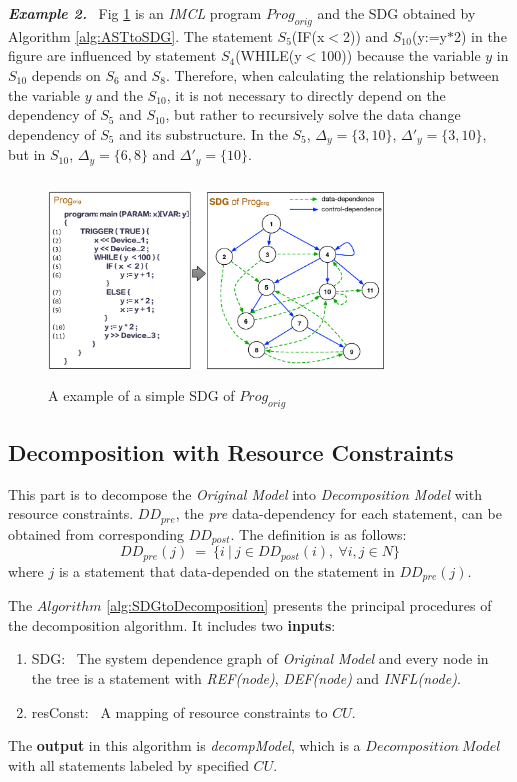 \textbf{\emph{Example 2.}} \ Fig \ref{fig_SDG_exapmle} is an \emph{IMCL} program $Prog_{orig}$ and the SDG obtained by Algorithm \ref{alg:ASTtoSDG}. The statement $S_{5}$(IF(x$<$2)) and $S_{10}$(y:=y$\ast$2) in the figure are influenced by statement $S_{4}$(WHILE(y$<$100)) because the variable $y$ in $S_{10}$ depends on $S_{6}$ and $S_{8}$. Therefore, when calculating the relationship between the variable $y$ and the $S_{10}$, it is not necessary to directly depend on the dependency of $S_{5}$ and $S_{10}$, but rather to recursively solve the data change dependency of $S_{5}$ and its substructure. In the $S_{5}$, $\Delta_{y}=\{3, 10\}$, $\Delta'_{y}=\{3, 10\}$, but in $S_{10}$, $\Delta_{y}=\{6,8\}$ and $\Delta'_{y} = \{10\}$.

\begin{figure}[!hptb]
    \centering
        \includegraphics[height=2.1in, width=3.5in]{fig_SDG_exapmle}
    \caption{A example of a simple SDG of $Prog_{orig}$}\label{fig_SDG_exapmle}
\end{figure}


\subsection{Decomposition with Resource Constraints}
This part is to decompose the \emph{Original Model} into \emph{Decomposition Model} with resource constraints. $DD_{pre}$, the \emph{pre} data-dependency for each statement, can be obtained from corresponding $DD_{post}$. The definition is as follows:
\begin{displaymath}
    DD_{pre}(j) \ = \ \{ i \ | \ j \in DD_{post}(i), \ \forall i, j \in N \}
\end{displaymath}
where $j$ is a statement that data-depended on the statement in $DD_{pre}(j)$.


The $Algorithm $ \ref{alg:SDGtoDecomposition} presents the principal procedures of the decomposition algorithm.
It includes two \textbf{inputs}:
\begin{enumerate}
  \item SDG: \ The system dependence graph of \emph{Original Model} and every node in the tree is a statement with \emph{REF(node)}, \emph{DEF(node)} and \emph{INFL(node)}.
  \item resConst: \ A mapping of resource constraints to $CU$.
\end{enumerate}
The \textbf{output} in this algorithm is \emph{decompModel}, which is a $Decomposition \ Model$ with all statements labeled by specified $CU$.

